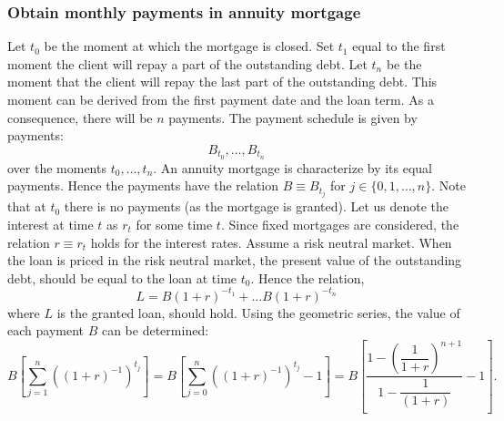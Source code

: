     \subsubsection{Obtain monthly payments in annuity mortgage}
        Let $t_0$ be the moment at which the mortgage is closed.
        Set $t_1$ equal to the first moment the client will repay a 
        part of the outstanding debt. 
        Let $t_n$ be the moment that the client will repay the last 
        part of the outstanding debt. This moment can be derived 
        from the first payment date and the loan term.
        As a consequence, there will be $n$ payments. 
        The payment schedule is given by payments:
        \begin{equation}
            B_{t_0}, \ldots, B_{t_n}
        \end{equation}
        over the moments $t_0, \ldots, t_n$. 
        An annuity mortgage is characterize by its equal payments.
        Hence the payments have the relation $B \equiv B_{t_j}$ for 
        $j \in \{0, 1, \ldots, n\}$. 
        Note that at $t_0$ there is no payments (as the mortgage is granted).
        Let us denote the interest at time $t$ as $r_t$ for some time 
        $t$. 
        Since fixed mortgages are considered, the relation $r \equiv r_t$ 
        holds for the interest rates. 
        Assume a risk neutral market. 
        When the loan is priced in the risk 
        neutral market, the present value of the outstanding debt, should be 
        equal to the loan at time $t_0$. Hence the relation,
        \begin{equation}
            L = B (1 + r)^{-t_1} + \ldots B (1 + r)^{-t_n}
        \end{equation}
        where $L$ is the granted loan, should hold. 
        Using the geometric series, the value of each payment 
        $B$ can be determined: 
        \begin{equation}
            B\left[
                \displaystyle\sum_{j=1}^{n} \left(
                    (1 + r)^{-1}
                    \right)^{t_j}  
            \right] = 
            B\left[
                \displaystyle\sum_{j=0}^{n} \left(
                    (1 + r)^{-1}
                    \right)^{t_j} - 1  
            \right] = 
            B \left[
                \dfrac{
                    1 - \left(
                        \dfrac{1}{1 + r}
                    \right)^{n+1}
                    }
                    {
                        1 - \dfrac{1}{(1 + r)}
                    } - 1
            \right].
        \end{equation}
